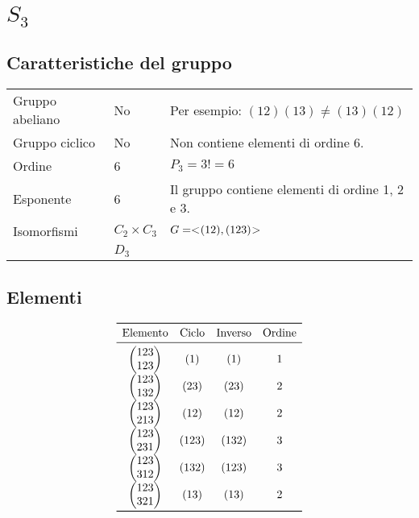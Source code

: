\chapter{$S_3$}
\label{chp:S3}

\section{Caratteristiche del gruppo}

\begin{center}
	\begin{tabular}{lll}
		Gruppo abeliano & No & Per esempio: $(12)(13) \neq (13)(12)$ \\
		Gruppo ciclico & No & Non contiene elementi di ordine 6. \\
		Ordine & 6 & $P_3 = 3! = 6$\\
		Esponente & 6 & Il gruppo contiene elementi di ordine 1, 2 e 3. \\
		Isomorfismi & $C_2 \times C_3$ & $G = < \negmedspace (12), (123) \negmedspace >$ \\
 		&  $D_3$ & 
	\end{tabular}
\end{center}

\section{Elementi}

\begin{center}
	\[
	\begin{array}{cccc}
		\toprule
		\text{Elemento} & \text{Ciclo} & \text{Inverso} & \text{Ordine} \\
		\midrule
		\begin{pmatrix}
			123 \\ 123
		\end{pmatrix}
		& (1)	& (1) & 1 \\
		\begin{pmatrix}
			123 \\ 132
		\end{pmatrix}
		& (23) & (23) & 2 \\
		\begin{pmatrix}
			123 \\ 213
		\end{pmatrix}
		& (12) & (12) & 2 \\
		\begin{pmatrix}
			123 \\ 231
		\end{pmatrix}
		& (123) & (132) & 3 \\
		\begin{pmatrix}
			123 \\ 312
		\end{pmatrix}
		& (132) & (123) & 3 \\
		\begin{pmatrix}
			123 \\ 321
		\end{pmatrix}
		& (13) & (13) & 2 \\
		\bottomrule
	\end{array}
	\]
\end{center}

